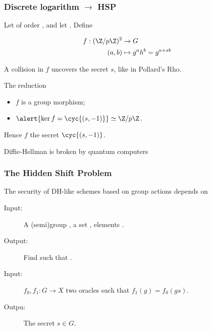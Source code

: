 \documentclass{beamer}
\renewcommand{\emph}[1]{}
\begin{document}

\begin{frame}
  \frametitle{Discrete logarithm $\to$ HSP}

  Let \emph{$G=\cyc{g}$} of order \emph{$p$}, and let
  \emph{$h=g^s$}. Define

  \begin{equation*}
    \begin{aligned}
      f : (\Z/p\Z)^2 &\to G\\
      (a,b) &\mapsto g^ah^b = g^{a+sb}
    \end{aligned}
  \end{equation*}

  \emph{Remark:} A collision in $f$ uncovers the secret $s$, like in
  Pollard's Rho.

  \begin{block}{The reduction}
    \begin{itemize}
    \item $f$ is a group morphism;
    \item $\alert{\ker f = \cyc{(s,-1)}} \simeq \Z/p\Z$.
    \end{itemize}
    Hence $f$ \emph{hides} the secret $\cyc{(s,-1)}$.
  \end{block}

  \emph{Consequence:} Diffie-Hellman is broken by quantum computers
\end{frame}


\begin{frame}
  \frametitle{The Hidden Shift Problem}
  
  The security of DH-like schemes based on group actions depends on

  \begin{definition}
    \begin{description}
    \item[Input:] A (semi)group \emph{$G$}, a set \emph{$X$}, elements
      \emph{$x,y\in X$}.
    \item[Output:] Find \emph{$s\in G$} such that \emph{$y=s\cdot x$}.
    \end{description}
  \end{definition}

  \begin{definition}
    \begin{description}
    \item[Input:] \alert{$f_0,f_1:G\to X$} two oracles such that
      \alert{$f_1(g) = f_0(gs)$}.
    \item[Outpu:] The secret \alert{$s\in G$}.
    \end{description}
  \end{definition}
\end{frame}
\end{document}
